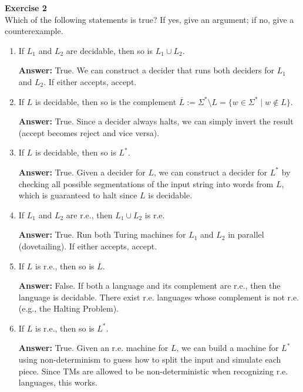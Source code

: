 \documentclass{article}
\theoremstyle{theorem}
\theoremstyle{definition}
\theoremstyle{remark}
\begin{document}
\textbf{Exercise 2}\\
Which of the following statements is true? If yes, give an argument; if no, give a counterexample.

\begin{enumerate}
    \item If \( L_1 \) and \( L_2 \) are decidable, then so is \( L_1 \cup L_2 \).
    
    \textbf{Answer:} True. We can construct a decider that runs both deciders for \( L_1 \) and \( L_2 \). If either accepts, accept.

    \item If \( L \) is decidable, then so is the complement \( \overline{L} := \Sigma^* \setminus L = \{ w \in \Sigma^* \mid w \notin L \} \).
    
    \textbf{Answer:} True. Since a decider always halts, we can simply invert the result (accept becomes reject and vice versa).

    \item If \( L \) is decidable, then so is \( L^* \).
    
    \textbf{Answer:} True. Given a decider for \( L \), we can construct a decider for \( L^* \) by checking all possible segmentations of the input string into words from \( L \), which is guaranteed to halt since \( L \) is decidable.

    \item If \( L_1 \) and \( L_2 \) are r.e., then \( L_1 \cup L_2 \) is r.e.
    
    \textbf{Answer:} True. Run both Turing machines for \( L_1 \) and \( L_2 \) in parallel (dovetailing). If either accepts, accept.

    \item If \( L \) is r.e., then so is \( \overline{L} \).
    
    \textbf{Answer:} False. If both a language and its complement are r.e., then the language is decidable. There exist r.e. languages whose complement is not r.e. (e.g., the Halting Problem).

    \item If \( L \) is r.e., then so is \( L^* \).
    
    \textbf{Answer:} True. Given an r.e. machine for \( L \), we can build a machine for \( L^* \) using non-determinism to guess how to split the input and simulate each piece. Since TMs are allowed to be non-deterministic when recognizing r.e. languages, this works.
\end{enumerate}
\end{document}
